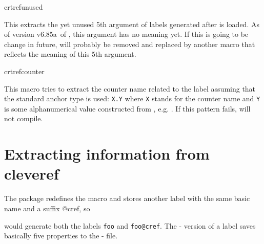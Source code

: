 \documentclass[12pt,a4paper,oneside]{article}
\makeatletter
\newcommand{\chdocextractversion}[1]{%
  \@nameuse{#1}%
}
\newcommand{\CHDocExpCommand}[1][Expandable]{%
  \tcbdocmarginnote[doclang/new={N},
  colframe=green!50!blue,
  halign=left,
  colback={green!90!blue},
  fontupper={\tiny}
  ]{%
    #1%
  }%
}
\def\hyperrefversionwithfifthargument{v6.85a}
\makeatother
\begin{document}
\begin{docCommand}[code={\CHDocExpCommand{}},
doc new={\chdocextractversion{crossreftoolsversion0.3}}]{crtrefunused}{}

This extracts the yet unused 5th argument of labels generated after  is loaded. As of version \hyperrefversionwithfifthargument\ of , this argument has no meaning yet. If this is going to be change in future,  will probably be removed and replaced by another macro that reflects the meaning of this 5th argument. 
\end{docCommand}

\begin{docCommand}[code={\CHDocExpCommand{}},
doc new={\chdocextractversion{crossreftoolsversion0.4}}]{crtrefcounter}{}

This macro tries to extract the counter name related to the label assuming that the standard anchor type is used: \texttt{X.Y} where \texttt{X} stands for the counter name and \texttt{Y} is some alphanumerical value constructed from , e.g. . If this pattern fails,  will not compile. 

\end{docCommand}


\section{Extracting information from cleveref}

The  package redefines the  macro and stores another label with the same basic name and a suffix \string @cref, so 



would generate both the labels \verb!foo! and \verb!foo@cref!. The  - version of a label saves basically five properties to the  - file. 
\end{document}
